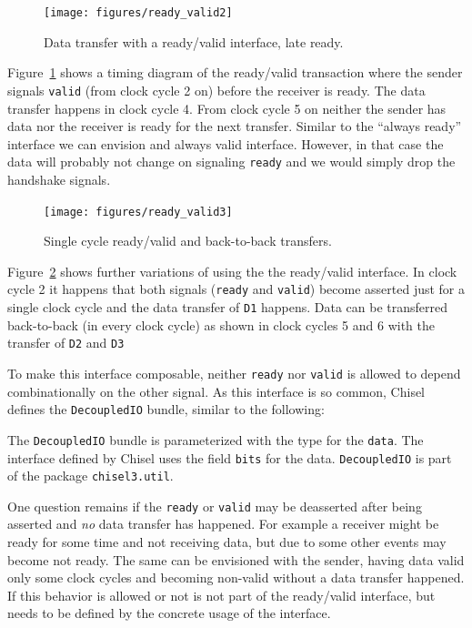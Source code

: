 \documentclass[%
    10pt,
    headinclude, footexclude,
    openright, %
    notitlepage,
    cleardoubleempty,
    headsepline,
    pointlessnumbers,
    bibtotoc, idxtotoc,
    ]{scrbook}
\newcommand{\code}[1]{{\small{\texttt{#1}}}}
\begin{document}
\begin{figure}
  \centering
  \texttt{[image: figures/ready\_valid2]}
  \caption{Data transfer with a ready/valid interface, late ready.}
  \label{fig:ready_valid2}
\end{figure}

Figure~\ref{fig:ready_valid2} shows a timing diagram of the ready/valid
transaction where the sender signals \code{valid} (from clock cycle 2 on)
before the receiver is ready. The data transfer happens in clock cycle 4.
From clock cycle 5 on neither the sender has data nor the receiver is ready
for the next transfer.
Similar to the ``always ready'' interface we can envision and always valid
interface. However, in that case the data will probably not change on signaling
\code{ready} and we would simply drop the handshake signals.

\begin{figure}
  \centering
  \texttt{[image: figures/ready\_valid3]}
  \caption{Single cycle ready/valid and back-to-back transfers.}
  \label{fig:ready_valid3}
\end{figure}

Figure~\ref{fig:ready_valid3} shows further variations of using the the ready/valid
interface. In clock cycle 2 it happens that both signals (\code{ready} and \code{valid})
become asserted just for a single clock cycle and the data transfer
of \code{D1} happens. Data can be transferred back-to-back (in every
clock cycle) as shown in clock cycles 5 and 6 with the transfer of
\code{D2} and \code{D3}

To make this interface composable, neither \code{ready} nor \code{valid} is
allowed to depend combinationally on the other signal.
As this interface is so common, Chisel defines the \code{DecoupledIO}
bundle, similar to the following:


\noindent The \code{DecoupledIO} bundle is parameterized with the type for
the \code{data}. The interface defined by Chisel uses the field \code{bits}
for the data. \code{DecoupledIO} is part of the package \code{chisel3.util}.

One question remains if the \code{ready} or \code{valid} may be deasserted
after being asserted and \emph{no} data transfer has happened.
For example a receiver might be ready for some time and not receiving data, but
due to some other events may become not ready.
The same can be envisioned with the sender, having data valid only some
clock cycles and becoming non-valid without a data transfer happened.
If this behavior is allowed or not is not part of the ready/valid interface,
but needs to be defined by the concrete usage of the interface.
\end{document}
